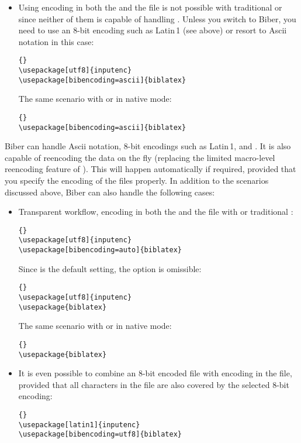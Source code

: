 \documentclass{ltxdockit}[2011/03/25]
\newcommand*{\biber}{Biber\xspace}
\begin{document}
\begin{itemize}
\item Using \utf encoding in both the  and the  file is not possible with traditional \bibtex or  since neither of them is capable of handling \utf. Unless you switch to \biber, you need to use an 8-bit encoding such as Latin\,1 (see above) or resort to Ascii notation in this case:

\begin{lstlisting}[style=latex]{}
\usepackage[utf8]{inputenc}
\usepackage[bibencoding=ascii]{biblatex}
\end{lstlisting}

The same scenario with \xetex or \luatex in native \utf mode:

\begin{lstlisting}[style=latex]{}
\usepackage[bibencoding=ascii]{biblatex}
\end{lstlisting}

\end{itemize}

\biber can handle Ascii notation, 8-bit encodings such as Latin\,1, and \utf. It is also capable of reencoding the  data on the fly (replacing the limited macro-level reencoding feature of ). This will happen automatically if required, provided that you specify the encoding of the  files properly. In addition to the scenarios discussed above, \biber can also handle the following cases:

\begin{itemize}

\item Transparent \utf workflow, \ie \utf encoding in both the  and the  file with \pdftex or traditional \tex:

\begin{lstlisting}[style=latex]{}
\usepackage[utf8]{inputenc}
\usepackage[bibencoding=auto]{biblatex}
\end{lstlisting}
%
Since  is the default setting, the option is omissible:

\begin{lstlisting}[style=latex]{}
\usepackage[utf8]{inputenc}
\usepackage{biblatex}
\end{lstlisting}

The same scenario with \xetex or \luatex in native \utf mode:

\begin{lstlisting}[style=latex]{}
\usepackage{biblatex}
\end{lstlisting}

\item It is even possible to combine an 8-bit encoded  file with \utf encoding in the  file, provided that all characters in the  file are also covered by the selected 8-bit encoding:

\begin{lstlisting}[style=latex]{}
\usepackage[latin1]{inputenc}
\usepackage[bibencoding=utf8]{biblatex}
\end{lstlisting}

\end{itemize}
\end{document}
